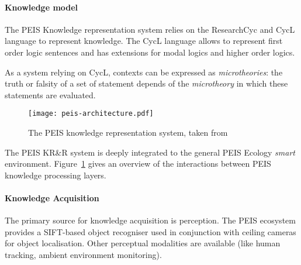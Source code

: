 \documentclass{IEEEtran}
\begin{document}

\paragraph{Knowledge model} The PEIS Knowledge representation system relies on
the {\sc ResearchCyc} and {\sc CycL} language to represent knowledge. The {\sc CycL} language
allows to represent first order logic sentences and has extensions for modal logics and higher order logics.


As a system relying on {\sc CycL}, contexts can be expressed as
\emph{microtheories}: the truth or falsity of a set of statement depends of the
\emph{microtheory} in which these statements are evaluated.


\begin{figure}
	\centering
	\texttt{[image: peis-architecture.pdf]}
	\caption{The PEIS knowledge representation system, taken from~\cite{Daoutis2009}}
	\label{fig|peis-archi}
\end{figure}

The PEIS KR\&R system is deeply integrated to the general PEIS Ecology
\emph{smart} environment. Figure~\ref{fig|peis-archi} gives an overview of the
interactions between PEIS knowledge processing layers.

\paragraph{Knowledge Acquisition} The primary source for knowledge acquisition
is perception.  The PEIS ecosystem provides a SIFT-based object recogniser used
in conjunction with ceiling cameras for object localisation.  Other perceptual
modalities are available (like human tracking, ambient environment monitoring).
\end{document}
